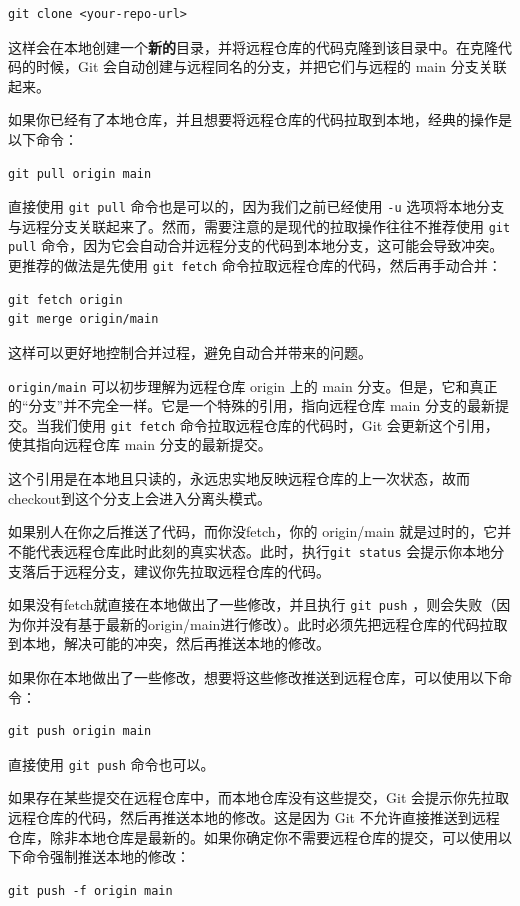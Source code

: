 \begin{verbatim}
git clone <your-repo-url>
\end{verbatim}

这样会在本地创建一个\textbf{新的}目录，并将远程仓库的代码克隆到该目录中。在克隆代码的时候，Git 会自动创建与远程同名的分支，并把它们与远程的 main 分支关联起来。

如果你已经有了本地仓库，并且想要将远程仓库的代码拉取到本地，经典的操作是以下命令：
\begin{verbatim}
git pull origin main
\end{verbatim}
直接使用  \texttt{git pull}  命令也是可以的，因为我们之前已经使用  \texttt{-u}  选项将本地分支与远程分支关联起来了。然而，需要注意的是现代的拉取操作往往不推荐使用  \texttt{git pull}  命令，因为它会自动合并远程分支的代码到本地分支，这可能会导致冲突。更推荐的做法是先使用  \texttt{git fetch}  命令拉取远程仓库的代码，然后再手动合并：
\begin{verbatim}
git fetch origin
git merge origin/main
\end{verbatim}
这样可以更好地控制合并过程，避免自动合并带来的问题。

\begin{tip}
  \texttt{origin/main} 可以初步理解为远程仓库 origin 上的 main 分支。但是，它和真正的“分支”并不完全一样。它是一个特殊的引用，指向远程仓库 main 分支的最新提交。当我们使用  \texttt{git fetch}  命令拉取远程仓库的代码时，Git 会更新这个引用，使其指向远程仓库 main 分支的最新提交。

  这个引用是在本地且只读的，永远忠实地反映远程仓库的上一次状态，故而checkout到这个分支上会进入分离头模式。
  
  如果别人在你之后推送了代码，而你没fetch，你的 origin/main 就是过时的，它并不能代表远程仓库此时此刻的真实状态。此时，执行\texttt{git status} 会提示你本地分支落后于远程分支，建议你先拉取远程仓库的代码。
  
  如果没有fetch就直接在本地做出了一些修改，并且执行 \texttt{git push} ，则会失败（因为你并没有基于最新的origin/main进行修改）。此时必须先把远程仓库的代码拉取到本地，解决可能的冲突，然后再推送本地的修改。
\end{tip}

如果你在本地做出了一些修改，想要将这些修改推送到远程仓库，可以使用以下命令：
\begin{verbatim}
git push origin main
\end{verbatim}
直接使用  \texttt{git push}  命令也可以。

如果存在某些提交在远程仓库中，而本地仓库没有这些提交，Git 会提示你先拉取远程仓库的代码，然后再推送本地的修改。这是因为 Git 不允许直接推送到远程仓库，除非本地仓库是最新的。如果你确定你不需要远程仓库的提交，可以使用以下命令强制推送本地的修改：
\begin{verbatim}
git push -f origin main
\end{verbatim}

